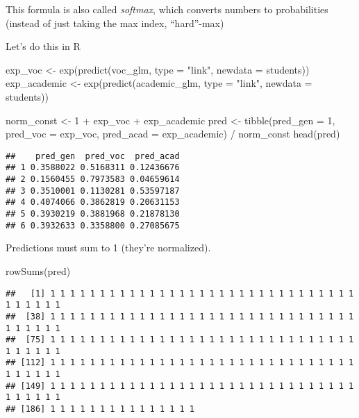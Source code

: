 \documentclass[
  oneside]{book}
\newenvironment{Shaded}{\begin{snugshade}}{\end{snugshade}}
\newcommand{\AttributeTok}[1]{\textcolor[rgb]{0.77,0.63,0.00}{#1}}
\newcommand{\DecValTok}[1]{\textcolor[rgb]{0.00,0.00,0.81}{#1}}
\newcommand{\FunctionTok}[1]{\textcolor[rgb]{0.00,0.00,0.00}{#1}}
\newcommand{\NormalTok}[1]{#1}
\newcommand{\OtherTok}[1]{\textcolor[rgb]{0.56,0.35,0.01}{#1}}
\newcommand{\SpecialCharTok}[1]{\textcolor[rgb]{0.00,0.00,0.00}{#1}}
\newcommand{\StringTok}[1]{\textcolor[rgb]{0.31,0.60,0.02}{#1}}
\begin{document}
This formula is also called \emph{softmax}, which converts numbers to probabilities (instead
of just taking the max index, ``hard''-max)

Let's do this in R

\begin{Shaded}
\begin{Highlighting}[]
\NormalTok{exp\_voc }\OtherTok{\textless{}{-}} \FunctionTok{exp}\NormalTok{(}\FunctionTok{predict}\NormalTok{(voc\_glm, }\AttributeTok{type =} \StringTok{"link"}\NormalTok{, }\AttributeTok{newdata =}\NormalTok{ students))}
\NormalTok{exp\_academic }\OtherTok{\textless{}{-}} \FunctionTok{exp}\NormalTok{(}\FunctionTok{predict}\NormalTok{(academic\_glm, }\AttributeTok{type =} \StringTok{"link"}\NormalTok{, }\AttributeTok{newdata =}\NormalTok{ students))}
\end{Highlighting}
\end{Shaded}

\begin{Shaded}
\begin{Highlighting}[]
\NormalTok{norm\_const }\OtherTok{\textless{}{-}} \DecValTok{1} \SpecialCharTok{+}\NormalTok{ exp\_voc }\SpecialCharTok{+}\NormalTok{ exp\_academic}
\NormalTok{pred }\OtherTok{\textless{}{-}} \FunctionTok{tibble}\NormalTok{(}\AttributeTok{pred\_gen =} \DecValTok{1}\NormalTok{, }\AttributeTok{pred\_voc =}\NormalTok{ exp\_voc, }
               \AttributeTok{pred\_acad =}\NormalTok{ exp\_academic) }\SpecialCharTok{/}\NormalTok{ norm\_const}
\FunctionTok{head}\NormalTok{(pred)}
\end{Highlighting}
\end{Shaded}

\begin{verbatim}
##    pred_gen  pred_voc  pred_acad
## 1 0.3588022 0.5168311 0.12436676
## 2 0.1560455 0.7973583 0.04659614
## 3 0.3510001 0.1130281 0.53597187
## 4 0.4074066 0.3862819 0.20631153
## 5 0.3930219 0.3881968 0.21878130
## 6 0.3932633 0.3358800 0.27085675
\end{verbatim}

Predictions must sum to 1 (they're normalized).

\begin{Shaded}
\begin{Highlighting}[]
\FunctionTok{rowSums}\NormalTok{(pred)}
\end{Highlighting}
\end{Shaded}

\begin{verbatim}
##   [1] 1 1 1 1 1 1 1 1 1 1 1 1 1 1 1 1 1 1 1 1 1 1 1 1 1 1 1 1 1 1 1 1 1 1 1 1 1
##  [38] 1 1 1 1 1 1 1 1 1 1 1 1 1 1 1 1 1 1 1 1 1 1 1 1 1 1 1 1 1 1 1 1 1 1 1 1 1
##  [75] 1 1 1 1 1 1 1 1 1 1 1 1 1 1 1 1 1 1 1 1 1 1 1 1 1 1 1 1 1 1 1 1 1 1 1 1 1
## [112] 1 1 1 1 1 1 1 1 1 1 1 1 1 1 1 1 1 1 1 1 1 1 1 1 1 1 1 1 1 1 1 1 1 1 1 1 1
## [149] 1 1 1 1 1 1 1 1 1 1 1 1 1 1 1 1 1 1 1 1 1 1 1 1 1 1 1 1 1 1 1 1 1 1 1 1 1
## [186] 1 1 1 1 1 1 1 1 1 1 1 1 1 1 1
\end{verbatim}
\end{document}

